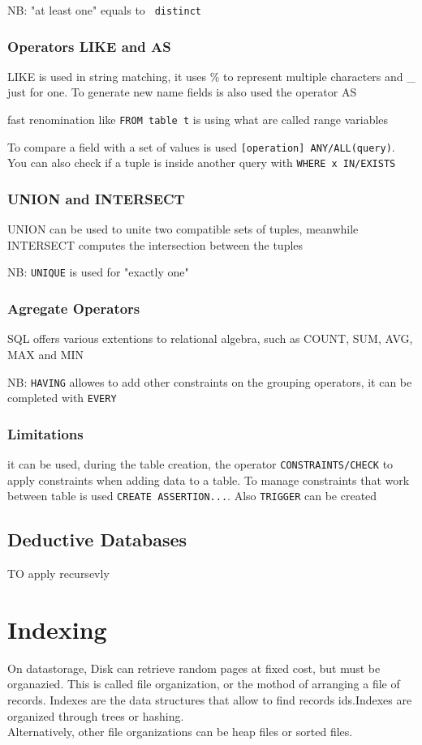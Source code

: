 \documentclass[12pt, a4paper]{article}
\begin{document}
NB: "at least one" equals to \texttt{ distinct}

\subsubsection{Operators LIKE and AS}
LIKE is used in string matching, it uses \% to represent multiple characters and \_ just for one. To generate new
name fields is also used the operator AS

fast renomination like \texttt{FROM table t} is using what are called range variables

To compare a field with a set of values is used \texttt{[operation] ANY/ALL(query)}. You can also check if a 
tuple is inside another query with \texttt{WHERE x IN/EXISTS}

\subsubsection{UNION and INTERSECT} 
UNION can be used to unite two compatible sets of tuples, meanwhile INTERSECT computes the intersection between the
tuples

NB: \texttt{UNIQUE} is used for "exactly one"

\subsubsection{Agregate Operators}
SQL offers various extentions to relational algebra, such as COUNT, SUM, AVG, MAX and MIN

NB: \texttt{HAVING} allowes to add other constraints on the grouping operators, it can be completed with
\texttt{EVERY}

\subsubsection{Limitations}
it can be used, during the table creation, the operator \texttt{CONSTRAINTS/CHECK} to apply constraints when
adding data to a table. To manage constraints that work between table is used \texttt{CREATE ASSERTION...}.
Also \texttt{TRIGGER} can be created

\subsection{Deductive Databases}
TO apply recursevly

\newpage
\section{Indexing}
On datastorage, Disk can retrieve random pages at fixed cost, but must be organazied. This is called file
organization, or the mothod of arranging a file of records. Indexes are the data structures that allow to 
find records ids.Indexes are organized through trees or hashing.\\Alternatively, other file organizations 
can be heap files or sorted files.
\end{document}
